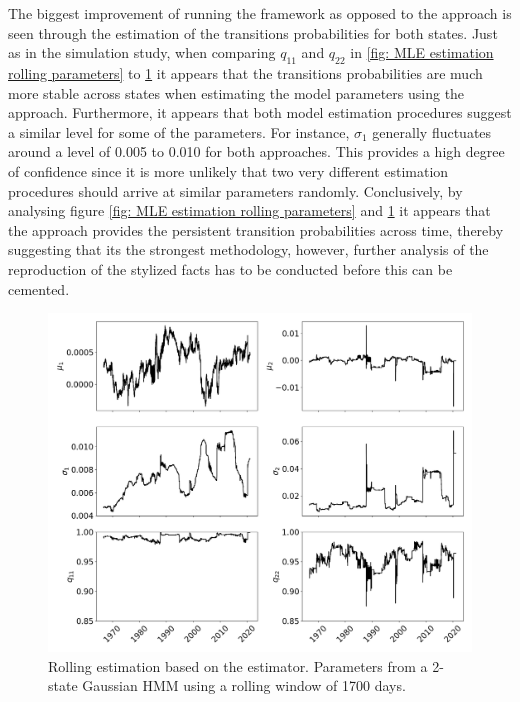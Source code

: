 The biggest improvement of running the \jump framework as opposed to the \mle approach is seen through the estimation of the transitions probabilities for both states. Just as in the simulation study, when comparing $q_{11}$ and $q_{22}$ in \cref{fig: MLE estimation rolling parameters} to \cref{fig: Jump estimation rolling parameters} it appears that the transitions probabilities are much more stable across states when estimating the model parameters using the \jump approach. Furthermore, it appears that both model estimation procedures suggest a similar level for some of the parameters. For instance, $\sigma_1$ generally fluctuates around a level of 0.005 to 0.010 for both approaches. This provides a high degree of confidence since it is more unlikely that two very different estimation procedures should arrive at similar parameters randomly. Conclusively, by analysing figure \ref{fig: MLE estimation rolling parameters} and \ref{fig: Jump estimation rolling parameters} it appears that the \jump approach provides the persistent transition probabilities across time, thereby suggesting that its the strongest methodology, however, further analysis of the reproduction of the stylized facts has to be conducted before this can be cemented.

\begin{figure}[H] 
    \centering
    \includegraphics[width=1.0\textwidth]{analysis/stylized_facts/images/2-state JUMP HMM rolling params.png}
    \caption[Rolling estimation based on the \jump estimator]{Rolling estimation based on the \jump estimator. Parameters from a 2-state Gaussian HMM using a rolling window of 1700 days.}
    \label{fig: Jump estimation rolling parameters} 
\end{figure}

